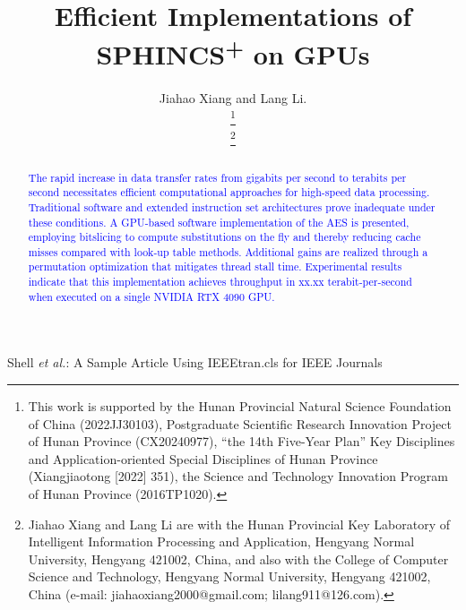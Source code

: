 \documentclass[journal]{IEEEtran}
\begin{document}
\title{Efficient Implementations of SPHINCS\textsuperscript{+} on GPUs}

\author{Jiahao Xiang and Lang Li.

  \thanks{This work is supported by the Hunan Provincial Natural Science Foundation of China (2022JJ30103), Postgraduate Scientific Research Innovation Project of Hunan Province (CX20240977), “the 14th Five-Year Plan” Key Disciplines and Application-oriented Special Disciplines of Hunan Province (Xiangjiaotong [2022] 351), the Science and Technology Innovation Program of Hunan Province (2016TP1020).}

  \thanks{Jiahao Xiang and Lang Li are with the Hunan Provincial Key Laboratory of Intelligent Information Processing and Application, Hengyang Normal University, Hengyang 421002, China, and also with the College of Computer Science and Technology, Hengyang Normal University, Hengyang 421002, China (e-mail: jiahaoxiang2000@gmail.com; lilang911@126.com).}%
}

%
{Shell \MakeLowercase{\textit{et al.}}: A Sample Article Using IEEEtran.cls for IEEE Journals}

\IEEEpubid{}

\maketitle

\begin{abstract}
  \textcolor{blue}{The rapid increase in data transfer rates from gigabits per second to terabits per second necessitates efficient computational approaches for high-speed data processing. Traditional software and extended instruction set architectures prove inadequate under these conditions. A GPU-based software implementation of the AES is presented, employing bitslicing to compute substitutions on the fly and thereby reducing cache misses compared with look-up table methods. Additional gains are realized through a permutation optimization that mitigates thread stall time. Experimental results indicate that this implementation achieves throughput in xx.xx terabit-per-second when executed on a single NVIDIA RTX 4090 GPU.
  }

\end{abstract}
\end{document}
